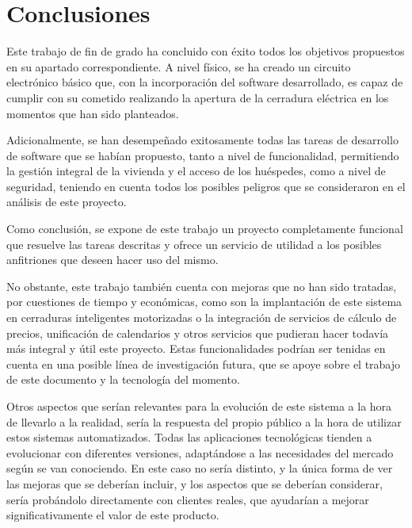 \chapter{Conclusiones}
\label{ch:conclusiones}

Este trabajo de fin de grado ha concluido con éxito todos los objetivos propuestos en su apartado correspondiente. A nivel físico, se ha creado un circuito electrónico básico que, con la incorporación del software desarrollado, es capaz de cumplir con su cometido realizando la apertura de la cerradura eléctrica en los momentos que han sido planteados.

Adicionalmente, se han desempeñado exitosamente todas las tareas de desarrollo de software que se habían propuesto, tanto a nivel de funcionalidad, permitiendo la gestión integral de la vivienda y el acceso de los huéspedes, como a nivel de seguridad, teniendo en cuenta todos los posibles peligros que se consideraron en el análisis de este proyecto.

Como conclusión, se expone de este trabajo un proyecto completamente funcional que resuelve las tareas descritas y ofrece un servicio de utilidad a los posibles anfitriones que deseen hacer uso del mismo.

No obstante, este trabajo también cuenta con mejoras que no han sido tratadas, por cuestiones de tiempo y económicas, como son la implantación de este sistema en cerraduras inteligentes motorizadas o la integración de servicios de cálculo de precios, unificación de calendarios y otros servicios que pudieran hacer todavía más integral y útil este proyecto. Estas funcionalidades podrían ser tenidas en cuenta en una posible línea de investigación futura, que se apoye sobre el trabajo de este documento y la tecnología del momento.

Otros aspectos que serían relevantes para la evolución de este sistema a la hora de llevarlo a la realidad, sería la respuesta del propio público a la hora de utilizar estos sistemas automatizados. Todas las aplicaciones tecnológicas tienden a evolucionar con diferentes versiones, adaptándose a las necesidades del mercado según se van conociendo. En este caso no sería distinto, y la única forma de ver las mejoras que se deberían incluir, y los aspectos que se deberían considerar, sería probándolo directamente con clientes reales, que ayudarían a mejorar significativamente el valor de este producto.